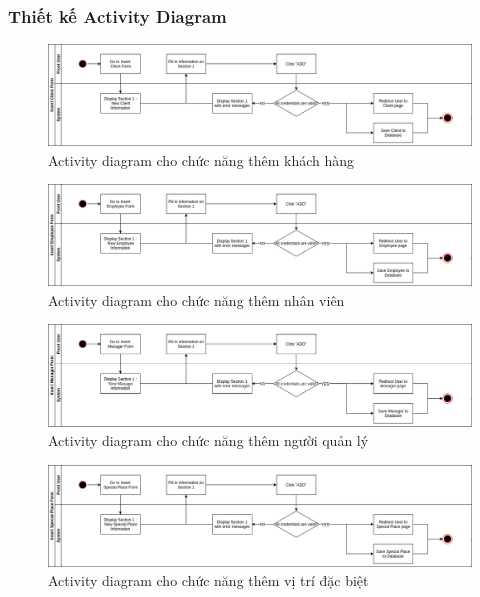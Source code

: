 \documentclass[a4paper]{article}
\begin{document}
\subsubsection{Thiết kế Activity Diagram}
\begin{figure}[!h]
    \includegraphics[width=14.7cm]{ActivityDiagram/AddCustomer}
    \centering
    \caption{Activity diagram cho chức năng thêm khách hàng}
    \label{fig:activity_add_customer}
\end{figure}
\begin{figure}[!h]
    \includegraphics[width=14.7cm]{ActivityDiagram/AddEmployee}
    \centering
    \caption{Activity diagram cho chức năng thêm nhân viên}
    \label{fig:activity_add_employee}
\end{figure}
\begin{figure}[!h]
    \includegraphics[width=14.7cm]{ActivityDiagram/AddManager}
    \centering
    \caption{Activity diagram cho chức năng thêm người quản lý}
    \label{fig:activity_add_manager}
\end{figure}
\clearpage
\begin{figure}[!h]
    \includegraphics[width=14.7cm]{ActivityDiagram/AddSpecialPlace}
    \centering
    \caption{Activity diagram cho chức năng thêm vị trí đặc biệt}
    \label{fig:activity_add_special_place}
\end{figure}
\end{document}
